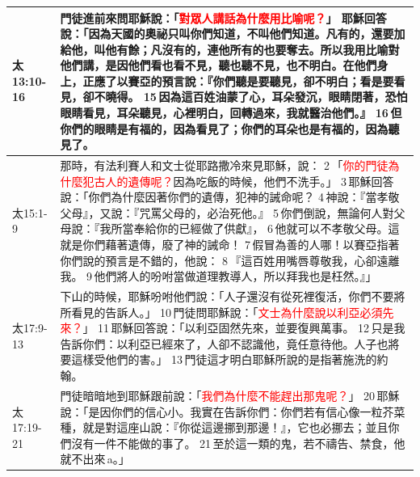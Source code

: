 \begin{table}[H]
\begin{tabular}{p{4.72em}|p{40.72em}}
太13:10-16&門徒進前來問耶穌說：「\textcolor{red}{對眾人講話為什麼用比喻呢？}」 耶穌回答說：「因為天國的奧祕只叫你們知道，不叫他們知道。凡有的，還要加給他，叫他有餘；凡沒有的，連他所有的也要奪去。所以我用比喻對他們講，是因他們看也看不見，聽也聽不見，也不明白。在他們身上，正應了以賽亞的預言說：『你們聽是要聽見，卻不明白；看是要看見，卻不曉得。 15 因為這百姓油蒙了心，耳朵發沉，眼睛閉著，恐怕眼睛看見，耳朵聽見，心裡明白，回轉過來，我就醫治他們。』 16 但你們的眼睛是有福的，因為看見了；你們的耳朵也是有福的，因為聽見了。\\\midrule
太15:1-9&那時，有法利賽人和文士從耶路撒冷來見耶穌，說： 2 「\textcolor{red}{你的門徒為什麼犯古人的遺傳呢？}因為吃飯的時候，他們不洗手。」 3 耶穌回答說：「你們為什麼因著你們的遺傳，犯神的誡命呢？ 4 神說：『當孝敬父母』，又說：『咒罵父母的，必治死他。』 5 你們倒說，無論何人對父母說：『我所當奉給你的已經做了供獻』， 6 他就可以不孝敬父母。這就是你們藉著遺傳，廢了神的誡命！ 7 假冒為善的人哪！以賽亞指著你們說的預言是不錯的，他說： 8 『這百姓用嘴唇尊敬我，心卻遠離我。 9 他們將人的吩咐當做道理教導人，所以拜我也是枉然。』」\\\midrule
太17:9-13&下山的時候，耶穌吩咐他們說：「人子還沒有從死裡復活，你們不要將所看見的告訴人。」 10 門徒問耶穌說：「\textcolor{red}{文士為什麼說以利亞必須先來？}」 11 耶穌回答說：「以利亞固然先來，並要復興萬事。 12 只是我告訴你們：以利亞已經來了，人卻不認識他，竟任意待他。人子也將要這樣受他們的害。」 13 門徒這才明白耶穌所說的是指著施洗的約翰。\\\midrule
太17:19-21&門徒暗暗地到耶穌跟前說：「\textcolor{red}{我們為什麼不能趕出那鬼呢？}」 20 耶穌說：「是因你們的信心小。我實在告訴你們：你們若有信心像一粒芥菜種，就是對這座山說：『你從這邊挪到那邊！』，它也必挪去；並且你們沒有一件不能做的事了。 21 至於這一類的鬼，若不禱告、禁食，他就不出來 a。」\\\midrule

    \bottomrule
    \end{tabular}%
  \label{tab:addlabel}%
\end{table}%


